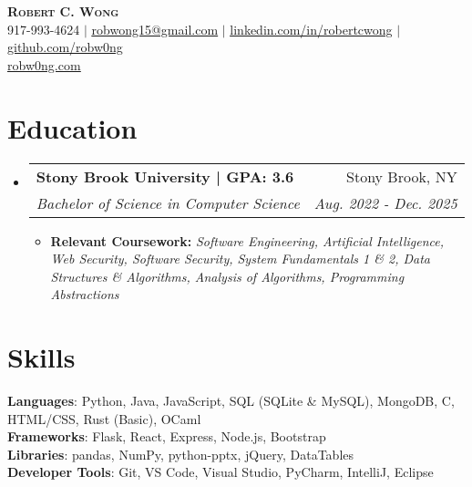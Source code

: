 \documentclass[letterpaper,11pt]{article}
\makeatletter
\newcommand{\resumeSubheading}[4]{
    \vspace{-2pt}\item
      \begin{tabular*}{0.97\textwidth}[t]{l@{\extracolsep{\fill}}r}
        \textbf{#1} & #2 \\
        \textit{\small#3} & \textit{\small #4} \\
      \end{tabular*}\vspace{-7pt}
  }
\newcommand{\resumeSubHeadingListStart}{\begin{itemize}[leftmargin=0.15in, label={}]}
\newcommand{\resumeSubHeadingListEnd}{\end{itemize}}
\makeatother
\begin{document}
\begin{center}
  \textbf{\Huge \scshape Robert C. Wong} \\ \vspace{1pt}
  \small 917-993-4624 $|$ \href{mailto:robwon15@gmail.com}{\underline{robwong15@gmail.com}} $|$
  \href{https://linkedin.com/in/robertcwong}{\underline{linkedin.com/in/robertcwong}} $|$
  \href{https://github.com/robw0ng/}{\underline{github.com/robw0ng}}
  \\
  \href{https://robw0ng.com/}{\underline{robw0ng.com}}

\end{center}
\vspace{-16pt}

\section{Education}
\resumeSubHeadingListStart
\resumeSubheading
{Stony Brook University | GPA: 3.6}{Stony Brook, NY}
{Bachelor of Science in Computer Science}{Aug. 2022 - Dec. 2025}
\begin{itemize}[leftmargin=0.15in, label={}, itemsep=10pt, topsep=5pt, parsep=0pt, partopsep=0pt]
  \item \small{\textbf{Relevant Coursework:} \textit{Software Engineering, Artificial Intelligence, Web Security, Software Security, System Fundamentals 1 \& 2, Data Structures \& Algorithms, Analysis of Algorithms, Programming Abstractions}}
\end{itemize}
\resumeSubHeadingListEnd
\vspace{-20pt}

\section{Skills}
\begin{itemize}[leftmargin=0.15in, label={}]
  \small{\item{
        \textbf{Languages}{: Python, Java, JavaScript, SQL (SQLite \& MySQL), MongoDB, C, HTML/CSS, Rust (Basic), OCaml} \\
        \textbf{Frameworks}{: Flask, React, Express, Node.js, Bootstrap} \\
        \textbf{Libraries}{: pandas, NumPy, python-pptx, jQuery, DataTables} \\
        \textbf{Developer Tools}{: Git, VS Code, Visual Studio, PyCharm, IntelliJ, Eclipse} \\
        }}
\end{itemize}
\vspace{-20pt}
\end{document}
